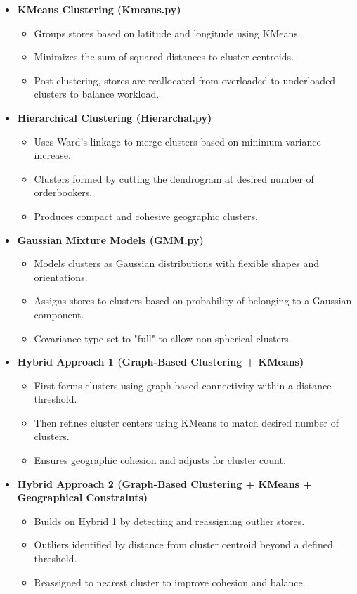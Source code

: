 \begin{itemize}
    \item \textbf{KMeans Clustering (Kmeans.py)}
    \begin{itemize}
        \item Groups stores based on latitude and longitude using KMeans.
        \item Minimizes the sum of squared distances to cluster centroids.
        \item Post-clustering, stores are reallocated from overloaded to underloaded clusters to balance workload.
    \end{itemize}
    
    \item \textbf{Hierarchical Clustering (Hierarchal.py)}
    \begin{itemize}
        \item Uses Ward's linkage to merge clusters based on minimum variance increase.
        \item Clusters formed by cutting the dendrogram at desired number of orderbookers.
        \item Produces compact and cohesive geographic clusters.
    \end{itemize}
    
    \item \textbf{Gaussian Mixture Models (GMM.py)}
    \begin{itemize}
        \item Models clusters as Gaussian distributions with flexible shapes and orientations.
        \item Assigns stores to clusters based on probability of belonging to a Gaussian component.
        \item Covariance type set to "full" to allow non-spherical clusters.
    \end{itemize}

    \item \textbf{Hybrid Approach 1 (Graph-Based Clustering + KMeans)}
    \begin{itemize}
        \item First forms clusters using graph-based connectivity within a distance threshold.
        \item Then refines cluster centers using KMeans to match desired number of clusters.
        \item Ensures geographic cohesion and adjusts for cluster count.
    \end{itemize}

    \item \textbf{Hybrid Approach 2 (Graph-Based Clustering + KMeans + Geographical Constraints)}
    \begin{itemize}
        \item Builds on Hybrid 1 by detecting and reassigning outlier stores.
        \item Outliers identified by distance from cluster centroid beyond a defined threshold.
        \item Reassigned to nearest cluster to improve cohesion and balance.
    \end{itemize}
\end{itemize}


